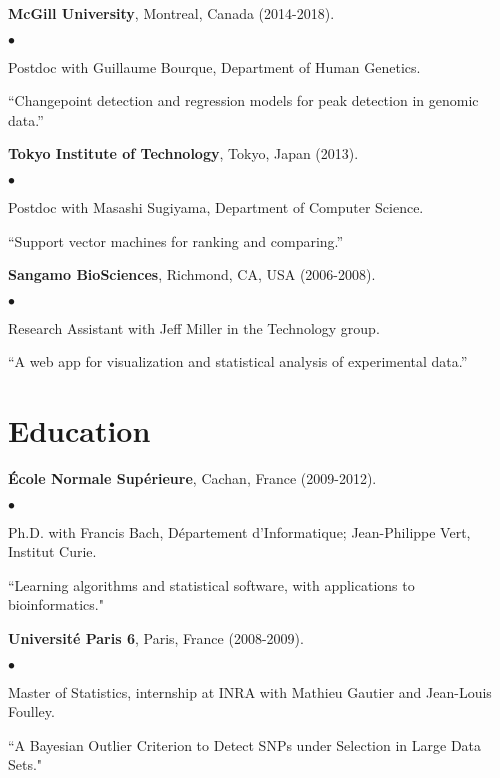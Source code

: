 \documentclass[margin,line]{res}
\newenvironment{list2}{
  \begin{list}{$\bullet$}{%
      \setlength{\itemsep}{0in}
      \setlength{\parsep}{0in} \setlength{\parskip}{0in}
      \setlength{\topsep}{0in} \setlength{\partopsep}{0in} 
      \setlength{\leftmargin}{0.2in}}}{\end{list}}
\begin{document}
\begin{resume}
{\bf McGill University}, Montreal, Canada (2014-2018).\\
\vspace*{-.1in}
\begin{list2}
\item[] Postdoc with Guillaume Bourque, Department of Human Genetics.
\item[]``Changepoint detection and regression models for peak detection in genomic data.''
\end{list2}

{\bf Tokyo Institute of Technology}, Tokyo, Japan (2013).\\
\vspace*{-.1in}
\begin{list2}
\item[] Postdoc with Masashi Sugiyama, Department of Computer Science.
\item[] ``Support vector machines for ranking and comparing.''
\end{list2}

{\bf Sangamo BioSciences}, Richmond, CA, USA (2006-2008).\\
\vspace*{-.1in}
\begin{list2}
\item[] Research Assistant with Jeff Miller in the Technology group.
\item[] ``A web app for visualization and statistical analysis of experimental data.''
\end{list2}

\section{\sc Education}

{\bf \'{E}cole Normale Sup\'{e}rieure}, Cachan, France (2009-2012).\\
\vspace*{-.1in}
\begin{list2}
\item[] Ph.D. with Francis Bach, D\'{e}partement d'Informatique; Jean-Philippe Vert, Institut Curie.
\item[] ``Learning algorithms and statistical software, with applications to bioinformatics."
\end{list2}

{\bf Universit\'e Paris 6}, Paris, France (2008-2009).\\
\vspace*{-.1in}
\begin{list2}
\item[] Master of Statistics, internship at INRA with Mathieu Gautier and Jean-Louis Foulley.
\item[] ``A Bayesian Outlier Criterion to Detect SNPs under Selection in Large Data Sets."
\end{list2}


\end{resume}
\end{document}
